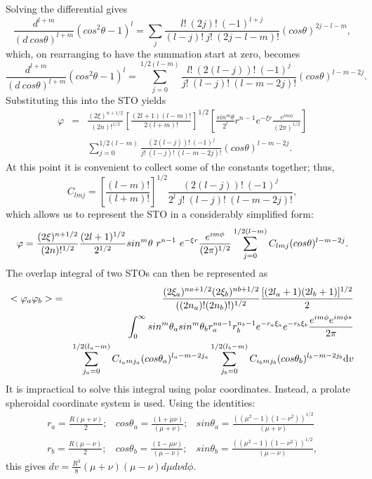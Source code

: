 Solving the differential gives
$$
\frac{d^{l+m}}{(d\ cos\theta)^{l+m}}(cos^2\theta-1)^l = \sum_j\frac{l!\ (2j)!\ (-1)^{l+j}}{(l-j)!\ j!\ (2j-l-m)!}(cos\theta )^{2j-l-m},
$$
which, on rearranging to have the summation start at zero,
becomes
$$
\frac{d^{l+m}}{(d\ cos\theta)^{l+m}}(cos^2\theta-1)^l = \sum_{j=0}^{1/2(l-m)}\frac{l!\ (2(l-j))!\ (-1)^j}{j!\ (l-j)!\ (l-m-2j)!}(cos\theta )^{l-m-2j}.
$$
Substituting this into the STO yields
\begin{eqnarray}
\varphi &=& \frac{(2\xi )^{n+1/2}}{(2n)!^{1/2}}\left [\frac{(2l+1)(l-m)!}{2(l+m)!}\right ]^{1/2}\left [\frac{sin^m\theta }{2^l}r^{n-1}e^{-\xi r}\frac{e^{im\phi}}{(2\pi )^{1/2}}\right ] \nonumber \\
&& \sum_{j=0}^{1/2(l-m)}\frac{(2(l-j))!\ (-1)^j}{j!\ (l-j)!\ (l-m-2j)!}(cos\theta )^{l-m-2j}. \nonumber
\end{eqnarray}
At this point it is convenient to collect some of the constants together; thus,
$$
C_{lmj}=\left [\frac{(l-m)!}{(l+m)!}\right ]^{1/2}\frac{(2(l-j))!\ (-1)^j}{2^l\ j!\ (l-j)!\ (l-m-2j)!},
$$
which allows us to represent the STO in a considerably simplified form:
$$
\varphi = \frac{(2\xi )^{n+1/2}}{(2n)!^{1/2}}\frac{(2l+1)^{1/2}}{2^{1/2}}sin^m\theta\
\/ r^{n-1}\ e^{-\xi r}\frac{e^{im\phi}}{(2\pi )^{1/2}}\sum_{j=0}^{1/2(l-m)}C_{lmj}(cos\theta)^{l-m-2j}.
$$
The overlap integral of two STOs can then be represented as
\begin{eqnarray}
<\varphi _a\varphi _b>& =& \frac{(2\xi _a)^{na+1/2}(2\xi _b)^{nb+1/2}}{((2n_a)!(2n_b)!)^{1/2}}
\frac{[(2l_a+1)(2l_b+1)]^{1/2}}{2}\nonumber \\ &&
\int _0^{\infty}sin^m\theta _a\/sin^m\theta _b\/r_a^{na-1}\/r_b^{n_b-1}e^{-r_a\xi _a}\/e^{-r_b\xi _b}\/
\frac{e^{im\phi}e^{im\phi *}}{2\pi } \nonumber \\
 & & \sum_{j_a=0}^{1/2(l_a-m)}C_{i_amj_a}(cos\theta_a)^{l_a-m-2j_a}
  \sum_{j_b=0}^{1/2(l_b-m)}C_{i_bmj_b}(cos\theta_b)^{l_b-m-2j_b}{\rm d}v\nonumber
\end{eqnarray}
It is impractical to solve this integral using polar
coordinates. Instead, a prolate spheroidal coordinate system is used. Using
the identities:
$$
\begin{array}{ccc}
r_a=\frac{R(\mu + \nu)}{2};  & cos\theta _a = \frac{(1+\mu \nu )}{(\mu + \nu )};&sin\theta _a = \frac{((\mu ^2-1)(1-\nu ^2))^{1/2}}{(\mu + \nu )} \\
 r_b=\frac{R(\mu - \nu)}{2}; &cos\theta _b = \frac{(1-\mu \nu )}{(\mu - \nu )};&
sin\theta _b = \frac{((\mu ^2-1)(1-\nu ^2))^{1/2}}{(\mu - \nu )},
\end{array}
$$
this gives
$
dv = \frac{R^3}{8}(\mu + \nu )(\mu - \nu)d\mu d\nu d\phi.
$

